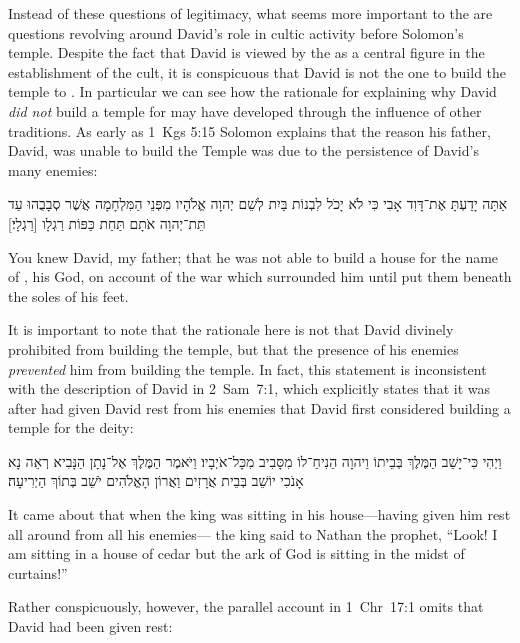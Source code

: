 Instead of these questions of legitimacy, what seems more important to the \chronicler are questions revolving around David's role in cultic activity before Solomon's temple. Despite the fact that David is viewed by the \chronicler as a central figure in the establishment of the cult, it is conspicuous that David is not the one to build the temple to \yahweh. In particular we can see how the rationale for explaining why David \emph{did not} build a temple for \yahweh may have developed through the influence of other traditions. As early as 1~Kgs 5:15 Solomon explains that the reason his father, David, was unable to build the Temple was due to the persistence of David's many enemies:
\begin{hebrewtext}
    אַתָּה יָדַעְתָּ אֶת־דָּוִד אָבִי כִּי לֹא יָכֹל לִבְנוֹת בַּיִת לְשֵׁם יְהוָה אֱלֹהָיו מִפְּנֵי הַמִּלְחָמָה אֲשֶׁר סְבָבֻהוּ עַד תֵּת־יְהוָה אֹתָם תַּחַת כַּפּוֹת רַגְלָו [רַגְלָי׃] 
\end{hebrewtext}
\begin{translation}
    You knew David, my father; that he was not able to build a house for the name of \yahweh, his God, on account of the war which surrounded him until \yahweh put them beneath the soles of his feet.
\end{translation}
\noindent
It is important to note that the rationale here is not that David divinely prohibited from building the temple, but that the presence of his enemies \emph{prevented} him from building the temple. In fact, this statement is inconsistent with the description of David in 2~Sam~7:1, which explicitly states that it was after \yahweh had given David rest from his enemies that David first considered building a temple for the deity:
    \begin{hebrewtext}
        וַיְהִי כִּי־יָשַׁב הַמֶּלֶךְ בְּבֵיתוֹ וַיהוָה הֵנִיחַ־לוֹ מִסָּבִיב מִכָּל־אֹיְבָיו׃
        וַיֹּאמֶר הַמֶּלֶךְ אֶל־נָתָן הַנָּבִיא רְאֵה נָא אָנֹכִי יוֹשֵׁב בְּבֵית אֲרָזִים וַאֲרוֹן הָאֱלֹהִים יֹשֵׁב בְּתוֹךְ הַיְרִיעָה׃
    \end{hebrewtext}
    \begin{translation}
        It came about that when the king was sitting in his house---\yahweh having given him rest all around from all his enemies---
        the king said to Nathan the prophet, ``Look! I am sitting in a house of cedar but the ark of God is sitting in the midst of curtains!''
    \end{translation}
\noindent
Rather conspicuously, however, the parallel account in 1~Chr~17:1 omits that David had been given rest:
